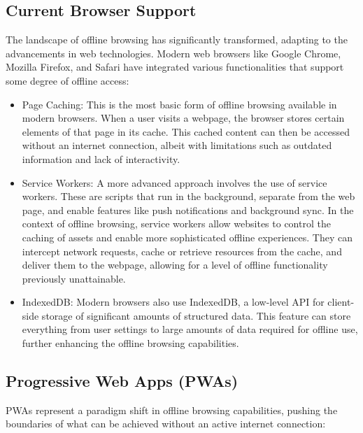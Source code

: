 \documentclass[12pt]{article}
\begin{document}
\subsection{Current Browser Support}

The landscape of offline browsing has significantly transformed, adapting to the advancements in web technologies. Modern web browsers like Google Chrome, Mozilla Firefox, and Safari have integrated various functionalities that support some degree of offline access:

\begin{itemize}[]
    \item Page Caching: This is the most basic form of offline browsing available in modern browsers. When a user visits a webpage, the browser stores certain elements of that page in its cache. This cached content can then be accessed without an internet connection, albeit with limitations such as outdated information and lack of interactivity.
    \item Service Workers: A more advanced approach involves the use of service workers. These are scripts that run in the background, separate from the web page, and enable features like push notifications and background sync. In the context of offline browsing, service workers allow websites to control the caching of assets and enable more sophisticated offline experiences. They can intercept network requests, cache or retrieve resources from the cache, and deliver them to the webpage, allowing for a level of offline functionality previously unattainable.
    \item IndexedDB: Modern browsers also use IndexedDB, a low-level API for client-side storage of significant amounts of structured data. This feature can store everything from user settings to large amounts of data required for offline use, further enhancing the offline browsing capabilities.
\end{itemize}
\citep*{PWA}
\subsection{Progressive Web Apps (PWAs)}

PWAs represent a paradigm shift in offline browsing capabilities, pushing the boundaries of what can be achieved without an active internet connection:
\end{document}
